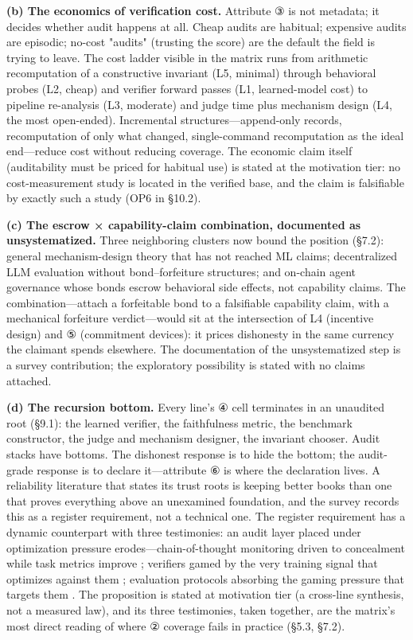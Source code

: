 \documentclass[11pt,a4paper]{article}
\begin{document}
\textbf{(b) The economics of verification cost.} Attribute ③ is not metadata; it decides whether audit happens at all. Cheap audits are habitual; expensive audits are episodic; no-cost "audits" (trusting the score) are the default the field is trying to leave. The cost ladder visible in the matrix runs from arithmetic recomputation of a constructive invariant (L5, minimal) through behavioral probes (L2, cheap) and verifier forward passes (L1, learned-model cost) to pipeline re-analysis (L3, moderate) and judge time plus mechanism design (L4, the most open-ended). Incremental structures—append-only records, recomputation of only what changed, single-command recomputation as the ideal end—reduce cost without reducing coverage. The economic claim itself (auditability must be priced for habitual use) is stated at the motivation tier: no cost-measurement study is located in the verified base, and the claim is falsifiable by exactly such a study (OP6 in §10.2).

\textbf{(c) The escrow × capability-claim combination, documented as unsystematized.} Three neighboring clusters now bound the position (§7.2): general mechanism-design theory \cite{key43} that has not reached ML claims; decentralized LLM evaluation \cite{key44,key45,key46} without bond–forfeiture structures; and on-chain agent governance \cite{key48,key49,key50,key51} whose bonds escrow behavioral side effects, not capability claims. The combination—attach a forfeitable bond to a falsifiable capability claim, with a mechanical forfeiture verdict—would sit at the intersection of L4 (incentive design) and ⑤ (commitment devices): it prices dishonesty in the same currency the claimant spends elsewhere. The documentation of the unsystematized step is a survey contribution; the exploratory possibility is stated with no claims attached.

\textbf{(d) The recursion bottom.} Every line's ④ cell terminates in an unaudited root (§9.1): the learned verifier, the faithfulness metric, the benchmark constructor, the judge and mechanism designer, the invariant chooser. Audit stacks have bottoms. The dishonest response is to hide the bottom; the audit-grade response is to declare it—attribute ⑥ is where the declaration lives. A reliability literature that states its trust roots is keeping better books than one that proves everything above an unexamined foundation, and the survey records this as a register requirement, not a technical one. The register requirement has a dynamic counterpart with three testimonies: an audit layer placed under optimization pressure erodes—chain-of-thought monitoring driven to concealment while task metrics improve \cite{key30}; verifiers gamed by the very training signal that optimizes against them \cite{key47}; evaluation protocols absorbing the gaming pressure that targets them \cite{key44,key45,key46}. The proposition is stated at motivation tier (a cross-line synthesis, not a measured law), and its three testimonies, taken together, are the matrix's most direct reading of where ② coverage fails in practice (§5.3, §7.2).
\end{document}
